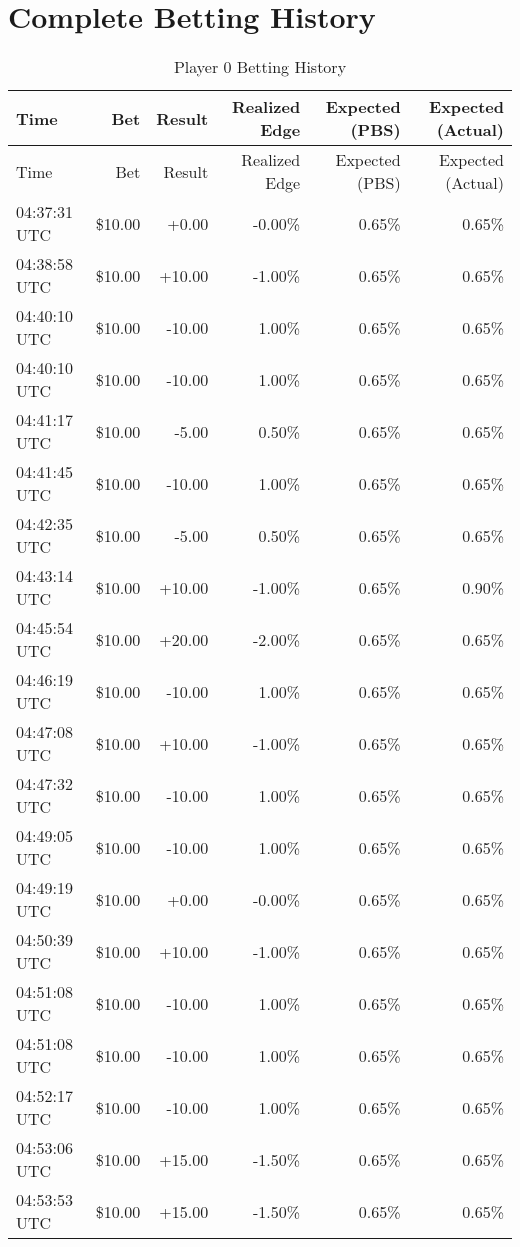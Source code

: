 \documentclass[11pt]{article}
\begin{document}
\section*{Complete Betting History}
\begin{longtable}{l | r | r | r | r | r}
\caption{Player 0 Betting History}\label{tab:history_p0}\\
\hline
Time & Bet & Result & Realized Edge & Expected (PBS) & Expected (Actual) \\ \hline
\endfirsthead
\hline
Time & Bet & Result & Realized Edge & Expected (PBS) & Expected (Actual) \\ \hline
\endhead
04:37:31 UTC & \$10.00 & +0.00 & -0.00\% & 0.65\% & 0.65\% \\
04:38:58 UTC & \$10.00 & +10.00 & -1.00\% & 0.65\% & 0.65\% \\
04:40:10 UTC & \$10.00 & -10.00 & 1.00\% & 0.65\% & 0.65\% \\
04:40:10 UTC & \$10.00 & -10.00 & 1.00\% & 0.65\% & 0.65\% \\
04:41:17 UTC & \$10.00 & -5.00 & 0.50\% & 0.65\% & 0.65\% \\
04:41:45 UTC & \$10.00 & -10.00 & 1.00\% & 0.65\% & 0.65\% \\
04:42:35 UTC & \$10.00 & -5.00 & 0.50\% & 0.65\% & 0.65\% \\
04:43:14 UTC & \$10.00 & +10.00 & -1.00\% & 0.65\% & 0.90\% \\
04:45:54 UTC & \$10.00 & +20.00 & -2.00\% & 0.65\% & 0.65\% \\
04:46:19 UTC & \$10.00 & -10.00 & 1.00\% & 0.65\% & 0.65\% \\
04:47:08 UTC & \$10.00 & +10.00 & -1.00\% & 0.65\% & 0.65\% \\
04:47:32 UTC & \$10.00 & -10.00 & 1.00\% & 0.65\% & 0.65\% \\
04:49:05 UTC & \$10.00 & -10.00 & 1.00\% & 0.65\% & 0.65\% \\
04:49:19 UTC & \$10.00 & +0.00 & -0.00\% & 0.65\% & 0.65\% \\
04:50:39 UTC & \$10.00 & +10.00 & -1.00\% & 0.65\% & 0.65\% \\
04:51:08 UTC & \$10.00 & -10.00 & 1.00\% & 0.65\% & 0.65\% \\
04:51:08 UTC & \$10.00 & -10.00 & 1.00\% & 0.65\% & 0.65\% \\
04:52:17 UTC & \$10.00 & -10.00 & 1.00\% & 0.65\% & 0.65\% \\
04:53:06 UTC & \$10.00 & +15.00 & -1.50\% & 0.65\% & 0.65\% \\
04:53:53 UTC & \$10.00 & +15.00 & -1.50\% & 0.65\% & 0.65\% \\
\hline
\end{longtable}
\end{document}
